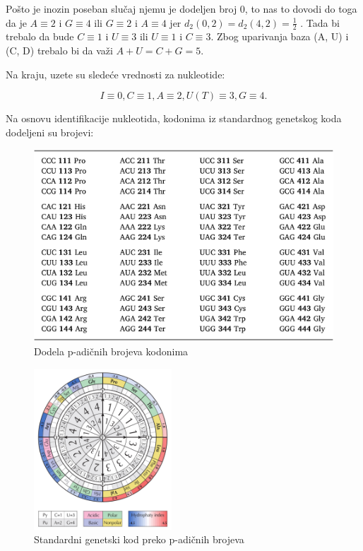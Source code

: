 \documentclass[a4paper,12pt]{article}
\begin{document}
Pošto je inozin poseban slučaj njemu je dodeljen broj 0, to nas to dovodi do toga da je \(A \equiv 2\) i \(G \equiv 4\) ili \(G \equiv 2\) i \(A \equiv 4\) jer \(d_{2}(0, 2) = d_{2}(4, 2) = \frac{1}{2}\)
. Tada bi trebalo da bude \(C \equiv 1\) i \(U \equiv 3\) ili \(U \equiv 1\) i \(C \equiv 3\). Zbog uparivanja baza (A, U) i (C, D) trebalo bi da važi \(A + U = C + G = 5\). 

Na kraju, uzete su sledeće vrednosti za nukleotide: 

\[
I \equiv 0, C \equiv 1, A \equiv 2, U (T) \equiv 3, G \equiv 4.
\]

\bigskip
Na osnovu identifikacije nukleotida, kodonima iz standardnog genetskog koda dodeljeni su brojevi:

\bigskip
\begin{figure}[h!]
  \centering
  \includegraphics[width=1\textwidth]{slika8.jpeg}
  \caption{Dodela p-adičnih brojeva kodonima}
  \label{fig:my_label}
\end{figure}

\newpage
\begin{figure}[h!]
  \centering
  \includegraphics[width=0.46\textwidth]{slika9.jpeg}
  \caption{Standardni genetski kod preko p-adičnih brojeva}
  \label{fig:my_label}
  \vspace{0.5cm}
\end{figure}
\end{document}
